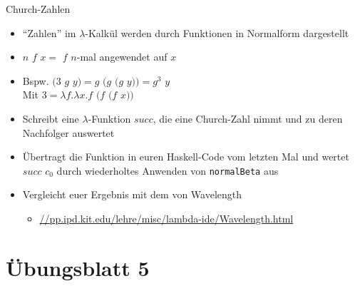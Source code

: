 \documentclass{beamer}
\begin{document}
\begin{frame}{Church-Zahlen}
	\begin{itemize}
		\item \enquote{Zahlen} im $\lambda$-Kalkül werden durch Funktionen in Normalform dargestellt
		\item $n$ $f$ $x =$ $f$ $n$-mal angewendet auf $x$
		\item Bspw. $(3$ $g$ $y) = g$ $(g $ $(g$ $y)) = g^3$ $y$\\
		      Mit $3 = \lambda{}f.\lambda{}x.f$ $(f $ $(f$ $x))$
		\item Schreibt eine $\lambda$-Funktion $succ$, die eine Church-Zahl nimmt und zu deren Nachfolger auswertet
		\pause
		\item Übertragt die Funktion in euren Haskell-Code vom letzten Mal und wertet $succ$ $c_0$ durch wiederholtes Anwenden von \texttt{normalBeta} aus
		\item Vergleicht euer Ergebnis mit dem von Wavelength
		\begin{itemize}
			\item \url{//pp.ipd.kit.edu/lehre/misc/lambda-ide/Wavelength.html}
		\end{itemize}
	\end{itemize}
\end{frame}

\section{Übungsblatt 5}

\newcommand{\E}{\;}

\newcommand{\liin}[2]{#1\E{}#2}
\newcommand{\liiin}[3]{#1\E{}#2\E{}#3}
\newcommand{\livn}[4]{#1\E{}#2\E{}#3\E{}#4}
\newcommand{\lvn}[5]{#1\E{}#2\E{}#3\E{}#4\E{}#5}

\newcommand{\lii}[2]{(#1\E{}#2)}
\newcommand{\liii}[3]{(#1\E{}#2\E{}#3)}

\newcommand{\liir}[2]{\textcolor{red}{\underline{(}}#1\E{}#2\textcolor{red}{\underline{)}}}
\newcommand{\liiir}[3]{\textcolor{red}{\underline{(}}#1\E{}#2\E{}#3\textcolor{red}{\underline{)}}}

\newcommand{\abs}[2]{\lambda{}#1.#2}
\end{document}
